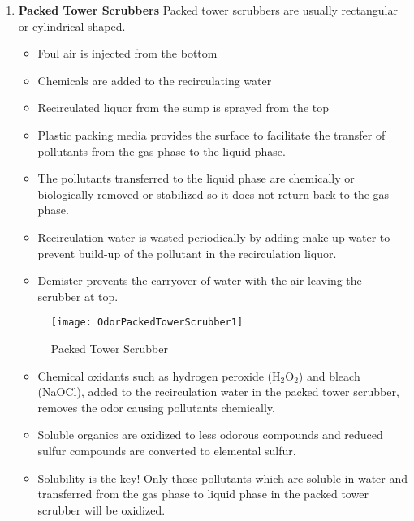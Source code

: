 \begin{enumerate}

\item \textbf{Packed Tower Scrubbers}
Packed tower scrubbers are usually rectangular or cylindrical shaped.
\begin{itemize}
\item Foul air is injected from the bottom
\item Chemicals are added to the recirculating water
\item Recirculated liquor from the sump is sprayed from the top
\item Plastic packing media provides the surface to facilitate the transfer of pollutants from the gas phase to the liquid phase.
\item The pollutants transferred to the liquid phase are chemically or biologically removed or stabilized so it does not return back to the gas phase.
\item Recirculation water is wasted periodically by adding make-up water to prevent build-up of the pollutant in the recirculation liquor.
\item Demister prevents the carryover of water with the air leaving the scrubber at top.
\end{itemize}

\begin{figure}[!h]
	\begin{center}
		\texttt{[image: OdorPackedTowerScrubber1]}
			\caption{Packed Tower Scrubber}
	\end{center}
	
	\end{figure}
	



\begin{itemize}
\item Chemical oxidants such as hydrogen peroxide (H$_2$O$_2$) and bleach (NaOCl), added to the recirculation water in the packed tower scrubber, removes the odor causing pollutants chemically.
\item Soluble organics are oxidized to less odorous compounds and reduced sulfur compounds are converted to elemental sulfur.
\item Solubility is the key! Only those pollutants which are soluble in water and transferred from the gas phase to liquid phase in the packed tower scrubber will be oxidized.
\end{itemize}



\end{enumerate}
